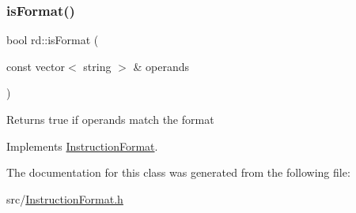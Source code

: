 \subsubsection{\texorpdfstring{is\+Format()}{isFormat()}}
{\footnotesize\ttfamily bool rd\+::is\+Format (\begin{DoxyParamCaption}\item[{const vector$<$ string $>$ \&}]{operands }\end{DoxyParamCaption})\hspace{0.3cm}{\ttfamily [virtual]}}

Returns true if operands match the format 

Implements \hyperlink{classInstructionFormat_a9fdcf94dcd7d9a55ba86e7a63f04d1fe}{Instruction\+Format}.



The documentation for this class was generated from the following file\+:\begin{DoxyCompactItemize}
\item 
src/\hyperlink{InstructionFormat_8h}{Instruction\+Format.\+h}\end{DoxyCompactItemize}
